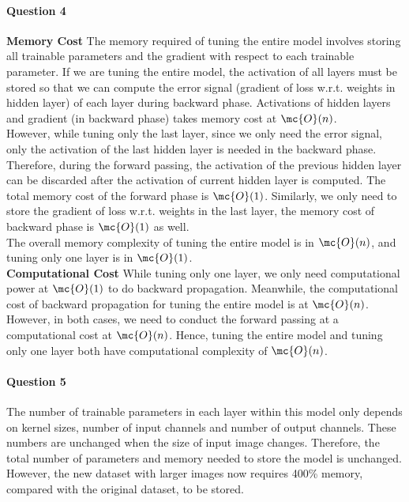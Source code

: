 \documentclass[12pt]{article}
\begin{document}
	\paragraph{Question 4} \textbf{Memory Cost} The memory required of tuning the entire model involves storing all trainable parameters and the gradient with respect to each trainable parameter. If we are tuning the entire model, the activation of all layers must be stored so that we can compute the error signal (gradient of loss w.r.t. weights in hidden layer) of each layer during backward phase. Activations of hidden layers and gradient (in backward phase) takes memory cost at $\mc{O}(n)$. \\
	However, while tuning only the last layer, since we only need the error signal, only the activation of the last hidden layer is needed in the backward phase. Therefore, during the forward passing, the activation of the previous hidden layer can be discarded after the activation of current hidden layer is computed. The total memory cost of the forward phase is $\mc{O}(1)$. Similarly, we only need to store the gradient of loss w.r.t. weights in the last layer, the memory cost of backward phase is $\mc{O}(1)$ as well. \\
	The overall memory complexity of tuning the entire model is in $\mc{O}(n)$, and tuning only one layer is in $\mc{O}(1)$. \\
	\textbf{Computational Cost}
	While tuning only one layer, we only need computational power at $\mc{O}(1)$ to do backward propagation. Meanwhile, the computational cost of backward propagation for tuning the entire model is at $\mc{O}(n)$. 
	However, in both cases, we need to conduct the forward passing at a computational cost at $\mc{O}(n)$.
	Hence, tuning the entire model and tuning only one layer both have computational complexity of $\mc{O}(n)$.
	
	\paragraph{Question 5} The number of trainable parameters in each layer within this model only depends on kernel sizes, number of input channels and number of output channels. These numbers are unchanged when the size of input image changes. Therefore, the total number of parameters and memory needed to store the model is unchanged. \\
	However, the new dataset with larger images now requires 400\% memory, compared with the original dataset, to be stored.
\end{document}
